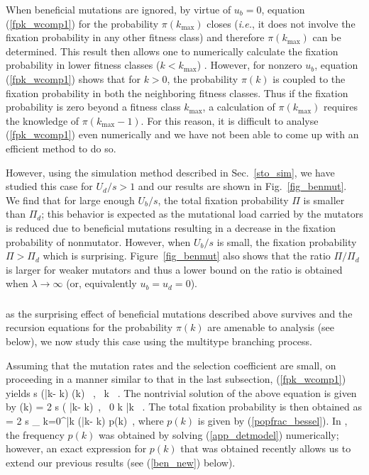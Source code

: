 \documentclass[preprint,12pt,number]{elsarticle}
\begin{document}
When beneficial mutations are ignored, by virtue of $u_b=0$, equation (\ref{fpk_wcomp1}) for the probability $\pi(k_{\max})$ closes ({\it i.e.}, it does not involve the fixation probability in any other fitness class) and therefore $\pi(k_{\max})$ can be determined.  This result then allows one to numerically calculate the fixation probability in lower fitness classes ($k < k_{\max}$) \citep{Johnson:2002}. However, for nonzero $u_b$, equation (\ref{fpk_wcomp1}) shows that for  $k > 0$, the probability $\pi(k)$ is coupled to the fixation probability in both the neighboring fitness classes. Thus if the fixation probability is zero beyond a fitness class $k_{\max}$, a calculation of $\pi(k_{\max})$ requires the knowledge of  $\pi(k_{\max}-1)$. For this reason, it is difficult to analyse (\ref{fpk_wcomp1}) even numerically and we have not been able to come up with an efficient method to do so. 

However, using the simulation method described in Sec.~\ref{sto_sim}, we have studied this case for $U_d/s > 1$ and our results are shown in Fig.~\ref{fig_benmut}. We find that for large enough $U_b/s$, the total fixation probability $\Pi$ is smaller than $\Pi_d$; this behavior is expected as the mutational load carried by the mutators is reduced due to beneficial mutations resulting in a decrease in the fixation probability of nonmutator.  However, when $U_b/s$ is small, the fixation probability $\Pi > \Pi_d$ which is surprising. Figure~\ref{fig_benmut} also shows that the ratio $\Pi/\Pi_d$ is larger for weaker mutators and thus a lower bound on the ratio is obtained when $\lambda \to \infty$ (or, equivalently $u_b=u_d=0$). 

\subsubsection{}

 as the surprising effect of beneficial mutations described above survives  \citep{James:2016} and the recursion equations for the probability $\pi(k)$ are amenable to analysis (see below), we now study this case using the multitype branching process.  

Assuming that the mutation rates and the selection coefficient are small, on proceeding in a manner similar to that in the last subsection, (\ref{fpk_wcomp1})  yields 
\be
{} \approx s ({\bar k}-  k) \pi(k) ~,~ k ~.
\ee
The nontrivial solution of the above equation is given by 
\be
\pi(k) = 2 s ( {\bar k}-  k)~,~ 0 \leq k  \leq  \lfloor \bar{k} \rfloor~.
\ee
The total fixation probability is then obtained as 
\be
\Pi= 2 s \sum_ {k=0}^{\lfloor \bar k \rfloor} ({\bar k}-  k) p(k)~,
\label{comp1}
\ee
where $p(k)$ is given by (\ref{popfrac_bessel}). In \citep{James:2016}, the frequency $p(k)$ was obtained by  solving (\ref{app_detmodel}) numerically; however, an exact expression for $p(k)$ that was obtained recently \citep{Jain:2016} allows us to extend our previous results (see (\ref{ben_new}) below). 
\end{document}
